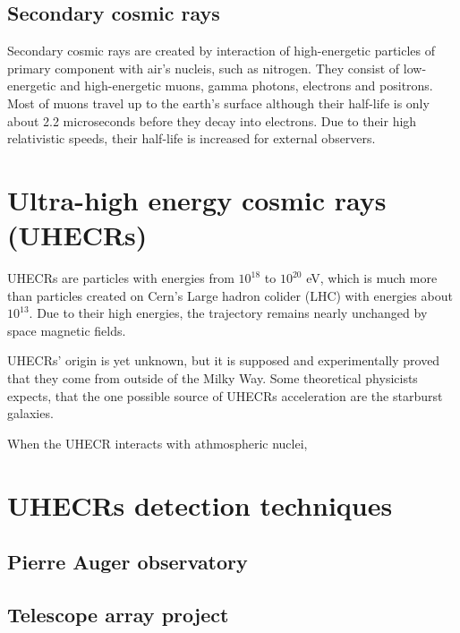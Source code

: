 \subsection{Secondary cosmic rays}
Secondary cosmic rays are created by interaction of high-energetic particles of primary component with air's nucleis, such as nitrogen. They consist of low-energetic and high-energetic muons, gamma photons, electrons and positrons. Most of muons travel up to the earth's surface although their half-life is only about 2.2 microseconds before they decay into electrons. Due to their high relativistic speeds, their half-life is increased for external observers. 




\section{Ultra-high energy cosmic rays (UHECRs)}
UHECRs are particles with energies from $10^18$ to $10^20$ eV, which is much more than particles created on Cern's Large hadron colider (LHC) with energies about $10^13$. Due to their high energies, the trajectory remains nearly unchanged by space magnetic fields.
\par
UHECRs' origin is yet unknown, but it is supposed and experimentally proved that they come from outside of the Milky Way. Some theoretical physicists expects, that the one possible source of UHECRs acceleration are the starburst galaxies.
\par
When the UHECR interacts with athmospheric nuclei,

\section{UHECRs detection techniques}


\subsection{Pierre Auger observatory}

\subsection{Telescope array project}
